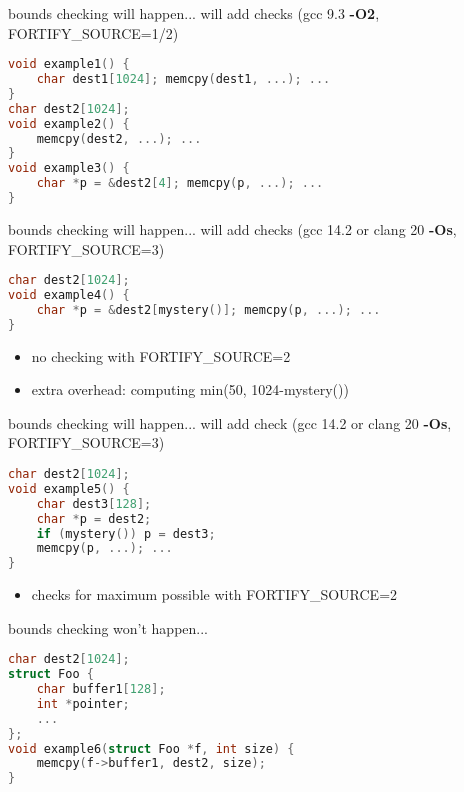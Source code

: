 \begin{frame}[fragile,label=fortifySrcExample]{bounds checking will happen...}
will add checks (gcc 9.3 \textbf{-O2}, FORTIFY\_SOURCE=1/2)
\begin{lstlisting}[language=C,style=smaller]
void example1() {
    char dest1[1024]; memcpy(dest1, ...); ...
}
char dest2[1024];
void example2() {
    memcpy(dest2, ...); ...
}
void example3() {
    char *p = &dest2[4]; memcpy(p, ...); ...
}
\end{lstlisting}
\end{frame}

\begin{frame}[fragile,label=fortifySrcExample2]{bounds checking will happen...}
will add checks (gcc 14.2 or clang 20 \textbf{-Os}, FORTIFY\_SOURCE=3)
\begin{lstlisting}[language=C,style=smaller]
char dest2[1024];
void example4() {
    char *p = &dest2[mystery()]; memcpy(p, ...); ...
}
\end{lstlisting}
\begin{itemize}
\item no checking with FORTIFY\_SOURCE=2
\item extra overhead: computing min(50, 1024-mystery())
\end{itemize}
\end{frame}

\begin{frame}[fragile,label=fortifySrcExample3]{bounds checking will happen...}
will add check (gcc 14.2 or clang 20 \textbf{-Os}, FORTIFY\_SOURCE=3)
\begin{lstlisting}[language=C,style=smaller]
char dest2[1024];
void example5() {
    char dest3[128];
    char *p = dest2;
    if (mystery()) p = dest3;
    memcpy(p, ...); ...
}
\end{lstlisting}
\begin{itemize}
\item checks for maximum possible with FORTIFY\_SOURCE=2
\end{itemize}
\end{frame}

\begin{frame}[fragile,label=fortifySourceExample4]{bounds checking won't happen...}
\begin{lstlisting}[language=C,style=smaller]
char dest2[1024];
struct Foo {
    char buffer1[128];
    int *pointer;
    ...
};
void example6(struct Foo *f, int size) {
    memcpy(f->buffer1, dest2, size);
}
\end{lstlisting}
\end{frame}

